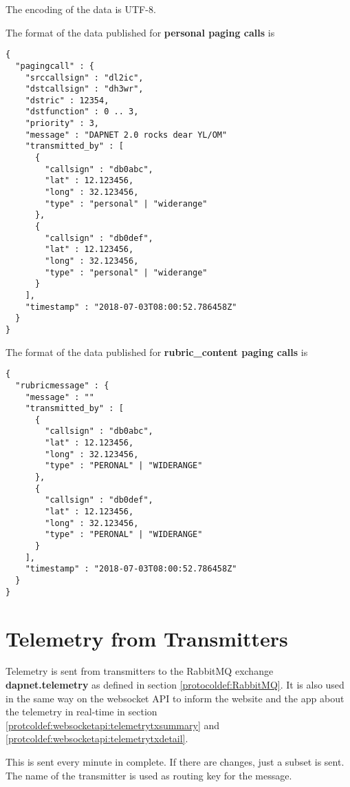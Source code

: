 The encoding of the data is UTF-8.

The format of the data published for \textbf{personal paging calls} is
\begin{lstlisting}
{
  "pagingcall" : {
    "srccallsign" : "dl2ic",
    "dstcallsign" : "dh3wr",
    "dstric" : 12354,
    "dstfunction" : 0 .. 3,
    "priority" : 3,
    "message" : "DAPNET 2.0 rocks dear YL/OM"
    "transmitted_by" : [
      {
        "callsign" : "db0abc",
        "lat" : 12.123456,
        "long" : 32.123456,
        "type" : "personal" | "widerange"
      },
      {
        "callsign" : "db0def",
        "lat" : 12.123456,
        "long" : 32.123456,
        "type" : "personal" | "widerange"
      }
    ],
    "timestamp" : "2018-07-03T08:00:52.786458Z"
  }
}
\end{lstlisting}

The format of the data published for \textbf{rubric\_content paging calls} is
\begin{lstlisting}
{
  "rubricmessage" : {
    "message" : ""
    "transmitted_by" : [
      {
        "callsign" : "db0abc",
        "lat" : 12.123456,
        "long" : 32.123456,
        "type" : "PERONAL" | "WIDERANGE"
      },
      {
        "callsign" : "db0def",
        "lat" : 12.123456,
        "long" : 32.123456,
        "type" : "PERONAL" | "WIDERANGE"
      }
    ],
    "timestamp" : "2018-07-03T08:00:52.786458Z"
  }
}
\end{lstlisting}

\section{Telemetry from Transmitters}
\label{protocoldef:telemetrytx}
Telemetry is sent from transmitters to the RabbitMQ exchange
\textbf{dapnet.telemetry} as defined in section \ref{protocoldef:RabbitMQ}. It
is also used in the same way on the websocket API to inform the website and the
app about the telemetry in real-time in section
\ref{protcoldef:websocketapi:telemetrytxsummary} and \ref{protcoldef:websocketapi:telemetrytxdetail}.

This is sent every minute in complete. If there are changes, just a subset is sent.
The name of the transmitter is used as routing key for the message.

